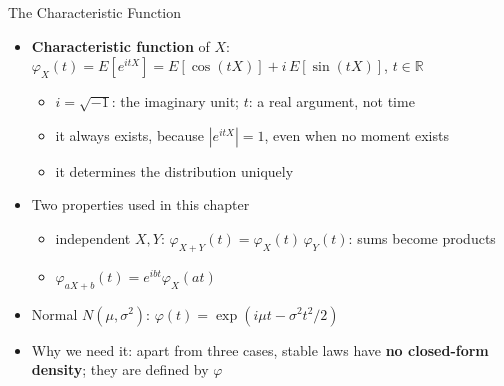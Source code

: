 \begin{frame}{The Characteristic Function}
\itemsize{\small}
\begin{itemize}
    \item \textbf{Characteristic function} of $X$: $\varphi_X(t) = E[e^{itX}] = E[\cos(tX)] + i\,E[\sin(tX)]$, $t \in \mathbb{R}$
    \begin{itemize}
        \item $i = \sqrt{-1}$: the imaginary unit; $t$: a real argument, not time
        \item it always exists, because $|e^{itX}| = 1$, even when no moment exists
        \item it determines the distribution uniquely
    \end{itemize}
    \item Two properties used in this chapter
    \begin{itemize}
        \item independent $X, Y$: $\varphi_{X+Y}(t) = \varphi_X(t)\,\varphi_Y(t)$: sums become products
        \item $\varphi_{aX+b}(t) = e^{ibt}\varphi_X(at)$
    \end{itemize}
    \item Normal $N(\mu, \sigma^2)$: $\varphi(t) = \exp(i\mu t - \sigma^2 t^2/2)$
    \item Why we need it: apart from three cases, stable laws have \textbf{no closed-form density}; they are defined by $\varphi$
\end{itemize}
\end{frame}

